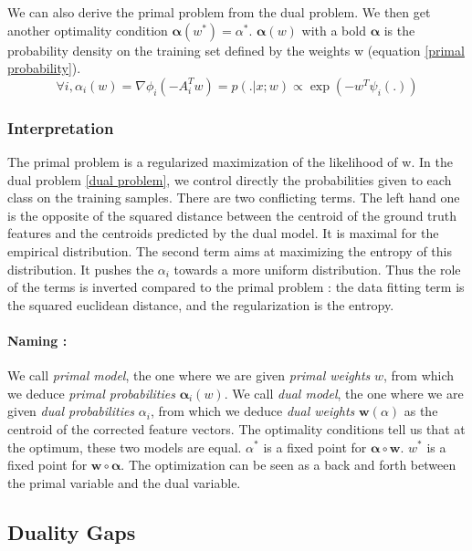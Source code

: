 \documentclass{article}
\DeclareMathOperator{\1}{\mathbb{1}}
\begin{document}
We can also derive the primal problem from the dual problem.
We then get another optimality condition $\bm \alpha(w^*) = \alpha^*$.
$\bm \alpha(w)$ with a bold $\bm \alpha$ is the probability density on the training set defined by the weights w (equation \ref{primal probability}).
\begin{equation}
	\label{primal to dual}
	\forall i, \alpha_i(w) = \nabla\phi_i(-A_i^Tw) = p(.|x; w) \propto \exp(-w^T \psi_i(.))
\end{equation}

\subsubsection*{Interpretation}
The primal problem is a regularized maximization of the likelihood of w. 
In the dual problem \ref{dual problem}, we control directly the probabilities given to each class on the training samples.
There are two conflicting terms.
The left hand one is the opposite of the squared distance between the centroid of the ground truth features and the centroids predicted by the dual model. It is maximal for the empirical distribution.
The second term aims at maximizing the entropy of this distribution.
It pushes the $\alpha_i$ towards a more uniform distribution.
Thus the role of the terms is inverted compared to the primal problem : the data fitting term is the squared euclidean distance, and the regularization is the entropy.

\paragraph{Naming :} 
We call \textit{primal model}, the one where we are given \textit{primal weights} $w$, from which we deduce \textit{primal probabilities} $\bm \alpha_i(w)$.
We call \textit{dual model}, the one where we are given \textit{dual probabilities} $\alpha_i$, from which we deduce \textit{dual weights} $\bm w(\alpha)$ as the centroid of the corrected feature vectors.
The optimality conditions tell us that at the optimum, these two models are equal.
$\alpha^*$ is a fixed point for $\bm \alpha \circ \bm w$.
$w^*$ is a fixed point for $\bm w \circ \bm \alpha$.
The optimization can be seen as a back and forth between the primal variable and the dual variable.

\subsection{Duality Gaps}
\end{document}

